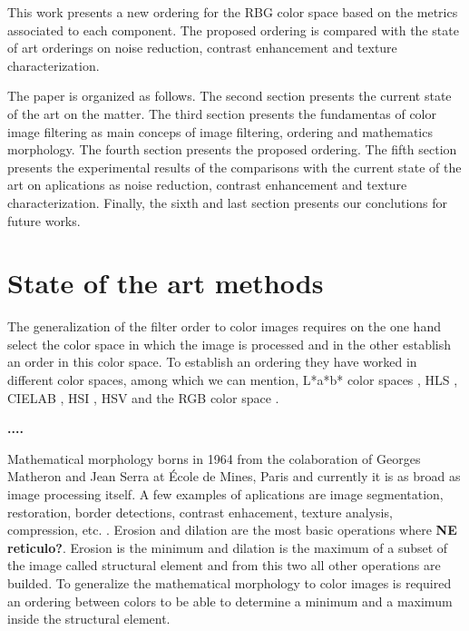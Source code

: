 This work presents a new ordering for the RBG color space based on the metrics associated to each component. The proposed ordering is compared with the state of art orderings on noise reduction, contrast enhancement and texture characterization.

The paper is organized as follows. The second section presents the current state of the art on the matter. The third section presents the fundamentas of color image filtering as main conceps of image filtering, ordering and mathematics morphology. The fourth section presents the proposed ordering. The fifth section presents the experimental results of the comparisons with the current state of the art on aplications as noise reduction, contrast enhancement and texture characterization. Finally, the sixth and last section presents our conclutions for future works.

\section{State of the art methods}
\label{Relacionados}

The generalization of the filter order to color images requires on the one hand select the color space in which the image is processed and in the other establish an order in this color space. To establish an ordering they have worked in different color spaces, among which we can mention, L*a*b* color spaces \cite{hanbury2001mathematical}, HLS \cite{hanbury2001mathematical2},  CIELAB \cite{hanbury2002mathematical3}, HSI \cite{tobar2007mathematical}, HSV \cite{lei2013vector} and the RGB color space  \cite{zaharescu2003color, gao2013adaptive, wang2012edge}.

\textbf{....} %

Mathematical morphology borns in 1964 from the colaboration of Georges Matheron and Jean Serra at École de Mines, Paris \cite{serra1982image} and currently it is as broad as image processing itself. A few examples of aplications are image segmentation, restoration, border detections, contrast enhacement, texture analysis, compression, etc. \cite{ortiz2002procesamiento}. %
Erosion and dilation are the most basic operations where \textbf{NE reticulo?}\cite{heijmans1990algebraic}. Erosion is the minimum and dilation is the maximum of a subset of the image called structural element and from this two all other operations are builded. To generalize the mathematical morphology to color images is required an ordering between colors to be able to determine a minimum and a maximum inside the structural element.

